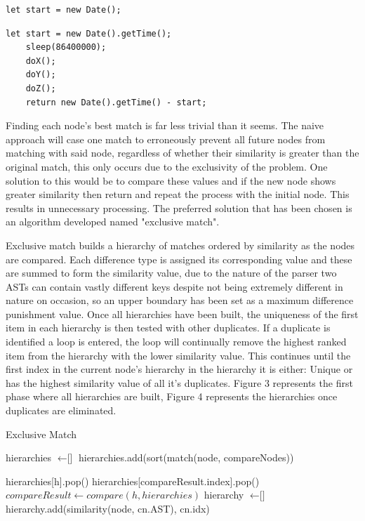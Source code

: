 \documentclass[jou,apacite]{apa6}
\begin{document}
\begin{lstlisting}[caption=Shares one node only - A]
let start = new Date();
\end{lstlisting}

\begin{lstlisting}[caption=Shares one node only - B]
    let start = new Date().getTime();
    sleep(86400000);
    doX();
    doY();
    doZ();
    return new Date().getTime() - start;
\end{lstlisting}

Finding each node’s best match is far less trivial than it seems. The naive approach will case one match to erroneously prevent all future nodes from matching with said node, regardless of whether their similarity is greater than the original match, this only occurs due to the exclusivity of the problem. One solution to this would be to compare these values and if the new node shows greater similarity then return and repeat the process with the initial node. This results in unnecessary processing. The preferred solution that has been chosen is an algorithm developed named "exclusive match".

Exclusive match builds a hierarchy of matches ordered by similarity as the nodes are compared. Each difference type is assigned its corresponding value and these are summed to form the similarity value, due to the nature of the parser two ASTs can contain vastly different keys despite not being extremely different in nature on occasion, so an upper boundary has been set as a maximum difference punishment value. Once all hierarchies have been built, the uniqueness of the first item in each hierarchy is then tested with other duplicates. If a duplicate is identified a loop is entered, the loop will continually remove the highest ranked item from the hierarchy with the lower similarity value. This continues until the first index in the current node's hierarchy in the hierarchy it is either: Unique or has the highest similarity value of all it's duplicates. Figure 3 represents the first phase where all hierarchies are built, Figure 4 represents the hierarchies once duplicates are eliminated.


\begin{algorithm}
\caption{Exclusive Match}\label{euclid}
\begin{algorithmic}[1]
\State hierarchies $\gets \textit{[]}$
	\State hierarchies.add(sort(match(node, compareNodes))
\EndFor

		\State hierarchies[h].pop()
		 \State hierarchies[compareResult.index].pop()
		\EndIf
		\State $compareResult \gets compare(h, hierarchies)$
	\EndWhile
\EndFor
{}
\State hierarchy $\gets \textit{[]}$
	\State hierarchy.add(similarity(node, cn.AST), cn.idx)
	
\EndFor
\EndProcedure

\end{algorithmic}
\end{algorithm}
\end{document}
